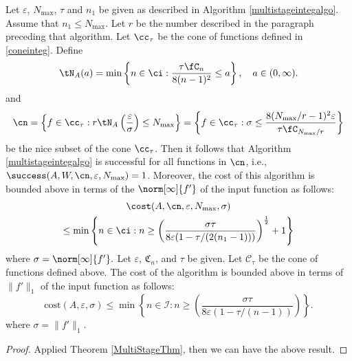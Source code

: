  \begin{theorem}

Let  $\varepsilon$, $N_{\max}$, $\tau$ and $n_1$ be given as described in Algorithm \ref{multistageintegalgo}.
Assume that $n_1 \le N_{\max}$. Let $r$ be the number described in the paragraph preceding that algorithm.
Let $\cc_\tau$ be the cone of functions defined in \eqref{coneinteg}.
Define
\[
\tN_A(a) = \min\left\{ n \in \ci : \frac{\tau \fC_n }{8(n-1)^2} \le a \right\}, \quad a \in (0,\infty).
\]
and
$$
\cn = \left \{ f \in \cc_\tau :r\tN_{A}\left(\frac{\varepsilon}{\sigma} \right) \le N_{\max} \right\}
= \left \{ f \in \cc_\tau : \sigma \le \frac{8(N_{\max}/r-1)^2 \varepsilon }{\tau \fC_{N_{\max}/r}  } \right\}
$$
be the nice subset of the cone $\cc_\tau$.  Then it follows that Algorithm \ref{multistageintegalgo} is successful for all functions in $\cn$,  i.e.,  $\success(A,W,\cn,\varepsilon,N_{\max}) = 1$.  Moreover, the cost of this algorithm is bounded above in terms of the $\norm[\infty]{f'}$ of the input function as follows:
\begin{multline}
\cost(A,\cn,\varepsilon,N_{\max},\sigma) \\
\le  \min\left\{ n \in \ci : n \ge \left(\frac{\sigma\tau}{8\varepsilon(1 - \tau/(2(n_{1}-1)))}\right)^{\frac{1}{2}} +1\right\}
\end{multline} where $\sigma=\norm[\infty]{f'}.$
   Let $\varepsilon$, $\mathfrak{C}_n$, and $\tau$ be given. Let $\mathcal{C}_{\tau}$ be the cone of functions defined above. The cost of the algorithm is bounded above in terms of $\|f'\|_{1}$ of the input function as follows:
   $$\text{cost}(A,\varepsilon,\sigma)\leq\min\left\{n\in\mathcal{I}:n\geq\left(\frac{\sigma\tau}{8\varepsilon(1-\tau/(n-1))}\right)\right\}.$$
   where $\sigma=\|f'\|_{1}.$
 \end{theorem}

\begin{proof}
Applied Theorem \ref{MultiStageThm}, then we can have the above result.
\end{proof}

